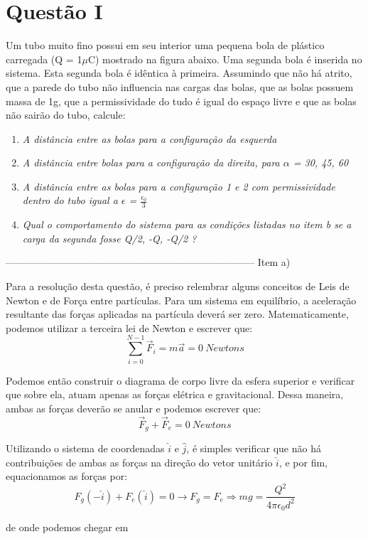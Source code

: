 \documentclass[journal,comsoc]{IEEEtran}
\begin{document}
\section{Questão I}
	Um tubo muito fino possui em seu interior uma pequena bola de plástico carregada (Q = 1$\mu$C) mostrado na figura abaixo. Uma segunda bola é inserida no sistema. Esta segunda bola é idêntica à primeira. Assumindo que não há atrito, que a parede do tubo não influencia nas cargas das bolas, que as bolas possuem massa de 1g, que a permissividade do tudo é igual do espaço livre e que as bolas não sairão do tubo, calcule:
    \begin{enumerate}
    	\item{\textit{A distância entre as bolas para a configuração da esquerda}}
        \item{\textit{A distância entre bolas para a configuração da direita, para $\alpha$ = 30, 45, 60}}
        \item{\textit{A distância entre as bolas para a configuração 1 e 2 com permissividade dentro do tubo igual a $\epsilon$ = $\frac{{\epsilon}_{0}}{3}$}}
        \item{\textit{Qual o comportamento do sistema para as condições listadas no item b se a carga da segunda fosse Q/2, -Q, -Q/2 ?}}
    \end{enumerate}
---------------------------------------------------------------------------
Item a)
\par Para a resolução desta questão, é preciso relembrar alguns conceitos de Leis de Newton e de Força entre partículas. Para um sistema em equilíbrio, a aceleração resultante das forças aplicadas na partícula deverá ser zero. Matematicamente, podemos utilizar a terceira lei de Newton e escrever que:
    \begin{equation}
    	\sum_{i=0}^{N-1} \vec{F}_{i}= m\vec{a} = 0\ Newtons
    \end{equation}

\par Podemos então construir o diagrama de corpo livre da esfera superior e verificar que sobre ela, atuam apenas as forças elétrica e gravitacional. Dessa maneira, ambas as forças deverão se anular e podemos escrever que:
    \begin{equation}
    	\vec{F}_{g} + \vec{F}_{e} = 0\ Newtons
    \end{equation}
\par Utilizando o sistema de coordenadas $\hat{i}$ e $\hat{j}$, é simples verificar que não há contribuições de ambas as forças na direção do vetor unitário $\hat{i}$, e por fim, equacionamos as forças por:
    \begin{equation}
    	F_{g}(-\hat{i}) + F_{e}(\hat{i}) = 0 \rightarrow  F_{g} = F_{e} \Rightarrow mg = \frac{Q^2}{4\pi{\epsilon}_{0}d^2} 
    \end{equation}
\par de onde podemos chegar em
\end{document}
